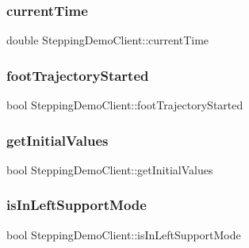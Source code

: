 \subsubsection{\texorpdfstring{current\+Time}{currentTime}}
{\footnotesize\ttfamily double Stepping\+Demo\+Client\+::current\+Time\hspace{0.3cm}{\ttfamily [private]}}

\hypertarget{classSteppingDemoClient_a6036e2d0b604648ca39e4d64b41a9d6e}{}\label{classSteppingDemoClient_a6036e2d0b604648ca39e4d64b41a9d6e} 
\subsubsection{\texorpdfstring{foot\+Trajectory\+Started}{footTrajectoryStarted}}
{\footnotesize\ttfamily bool Stepping\+Demo\+Client\+::foot\+Trajectory\+Started\hspace{0.3cm}{\ttfamily [private]}}

\hypertarget{classSteppingDemoClient_aedd8bb5bca60afbdd2b8de3b5d1829d7}{}\label{classSteppingDemoClient_aedd8bb5bca60afbdd2b8de3b5d1829d7} 
\subsubsection{\texorpdfstring{get\+Initial\+Values}{getInitialValues}}
{\footnotesize\ttfamily bool Stepping\+Demo\+Client\+::get\+Initial\+Values\hspace{0.3cm}{\ttfamily [private]}}

\hypertarget{classSteppingDemoClient_a88b84ed8fc7808ea3fb68f2ec3d29ebe}{}\label{classSteppingDemoClient_a88b84ed8fc7808ea3fb68f2ec3d29ebe} 
\subsubsection{\texorpdfstring{is\+In\+Left\+Support\+Mode}{isInLeftSupportMode}}
{\footnotesize\ttfamily bool Stepping\+Demo\+Client\+::is\+In\+Left\+Support\+Mode\hspace{0.3cm}{\ttfamily [private]}}

